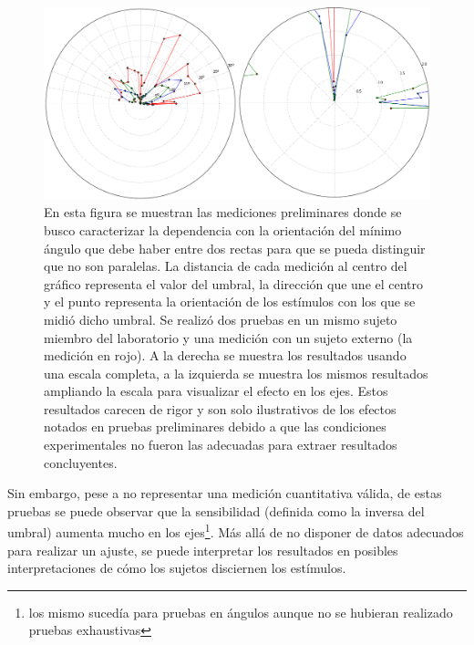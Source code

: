\documentclass{article}
\numberwithin{figure}{section}
\begin{document}
    \begin{figure}
        \center
        \includegraphics[width=\textwidth]{Imagenes/Umbral.png}
        \caption{En esta figura se muestran las mediciones preliminares donde se busco caracterizar la dependencia con la orientación del mínimo ángulo que debe haber entre dos rectas para que se pueda distinguir que no son paralelas. La distancia de cada medición al centro del gráfico representa el valor del umbral, la dirección que une el centro y el punto representa la orientación de los estímulos con los que se midió dicho umbral. Se realizó dos pruebas en un mismo sujeto miembro del laboratorio y una medición con un sujeto externo (la medición en rojo). A la derecha se muestra los resultados usando una escala completa, a la izquierda se muestra los mismos resultados ampliando la escala para visualizar el efecto en los ejes. Estos resultados carecen de rigor y son solo ilustrativos de los efectos notados en pruebas preliminares debido a que las condiciones experimentales no fueron las adecuadas para extraer resultados concluyentes.}
        \label{fig:Umbral}
    \end{figure}  
    
    
          
    
    
    Sin embargo, pese a no representar una medición cuantitativa válida, de estas pruebas se puede observar que la sensibilidad (definida como la inversa del umbral) aumenta mucho en los ejes\footnote{los mismo sucedía para pruebas en ángulos aunque no se hubieran realizado pruebas exhaustivas}. Más allá de no disponer de datos adecuados para realizar un ajuste, se puede interpretar los resultados en posibles interpretaciones de cómo los sujetos disciernen los estímulos.
    
\end{document}
